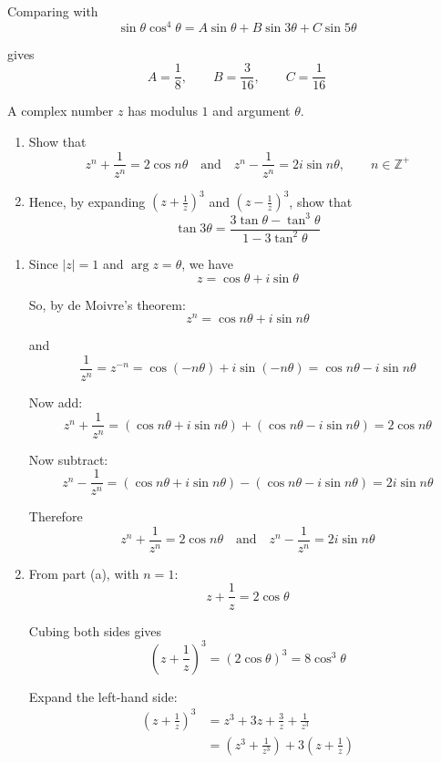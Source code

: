 \documentclass[leqno]{article}
\begin{document}
\begin{enumerate}[
  label=\textbf{\arabic*.},
  leftmargin=*,
  topsep=0pt,
  partopsep=0pt,
  parsep=0pt
]
\begin{djsSolution}
Comparing with
\[
\sin\theta\cos^4\theta=A\sin\theta+B\sin3\theta+C\sin5\theta
\]

gives
\[
A=\frac{1}{8},\qquad B=\frac{3}{16},\qquad C=\frac{1}{16}
\]
\end{djsSolution}


\newpage

\questionitem

A complex number $z$ has modulus $1$ and argument $\theta$. \\
\begin{enumerate}[label=\textbf{(\alph*)}]
  \item Show that
  \[
  z^n + \frac{1}{z^n} = 2\cos n\theta
  \quad\text{and}\quad
  z^n - \frac{1}{z^n} = 2i\sin n\theta,
  \qquad n \in \mathbb{Z}^+
  \]
  \item Hence, by expanding $\left(z + \frac{1}{z}\right)^3$ and $\left(z - \frac{1}{z}\right)^3$, show that
  \[
  \tan 3\theta = \frac{3\tan\theta - \tan^3\theta}{1 - 3\tan^2\theta}
  \]
\end{enumerate}

\vspace*{10pt}

\begin{djsSolution}
\begin{enumerate}[label=\textbf{(\alph*)}]
  \item Since $|z|=1$ and $\arg z=\theta$, we have
\[
z=\cos\theta+i\sin\theta
\]

So, by de Moivre's theorem:
\[
z^n=\cos n\theta+i\sin n\theta
\]

and
\[
\frac{1}{z^n}=z^{-n}=\cos(-n\theta)+i\sin(-n\theta)=\cos n\theta-i\sin n\theta
\]

Now add:
\[
z^n+\frac{1}{z^n}
=(\cos n\theta+i\sin n\theta)+(\cos n\theta-i\sin n\theta)
=2\cos n\theta
\]

Now subtract:
\[
z^n-\frac{1}{z^n}
=(\cos n\theta+i\sin n\theta)-(\cos n\theta-i\sin n\theta)
=2i\sin n\theta
\]

Therefore
\[
z^n+\frac{1}{z^n}=2\cos n\theta
\quad\text{and}\quad
z^n-\frac{1}{z^n}=2i\sin n\theta
\]

  \item From part (a), with $n=1$:
\[
z+\frac{1}{z}=2\cos\theta
\]

Cubing both sides gives
\[
\left(z+\frac{1}{z}\right)^3=(2\cos\theta)^3=8\cos^3\theta
\]

Expand the left-hand side:
\begin{align*}
\left(z+\frac{1}{z}\right)^3
&=z^3+3z+\frac{3}{z}+\frac{1}{z^3} \\
&=\left(z^3+\frac{1}{z^3}\right)+3\left(z+\frac{1}{z}\right)
\end{align*}


\end{enumerate}
\end{djsSolution}
\end{enumerate}
\end{document}
